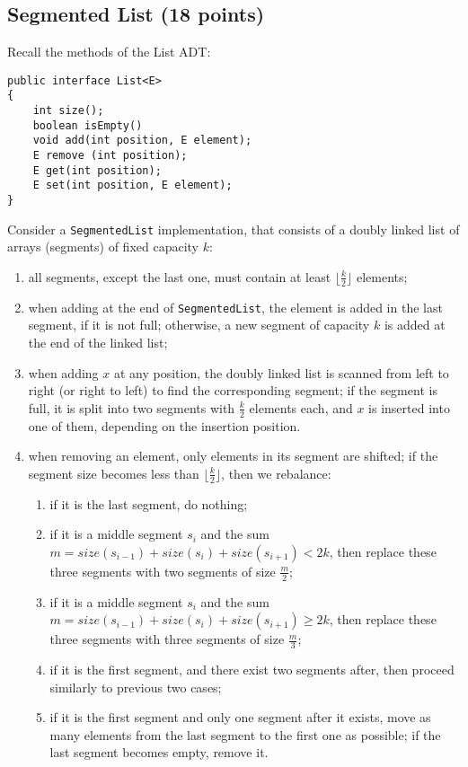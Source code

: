 \documentclass{article}
\begin{document}
\subsection*{Segmented List (18 points)}
Recall the methods of the List ADT:

\begin{verbatim}
public interface List<E>
{
    int size();
    boolean isEmpty()
    void add(int position, E element);
    E remove (int position);
    E get(int position);
    E set(int position, E element);
}    
\end{verbatim}

Consider a \texttt{SegmentedList} implementation, that consists of a doubly linked list of arrays (segments) of fixed capacity $k$:
\begin{enumerate}
    \item all segments, except the last one, must contain at least $\lfloor\frac{k}{2}\rfloor$ elements;
    \item when adding at the end of \texttt{SegmentedList}, the element is added in the last segment, if it is not full; otherwise, a new segment of capacity $k$ is added at the end of the linked list;
    \item when adding $x$ at any position, the doubly linked list is scanned from left to right (or right to left) to find the corresponding segment; if the segment is full, it is split into two segments with $\frac{k}{2}$ elements each, and $x$ is inserted into one of them, depending on the insertion position.
    \item when removing an element, only elements in its segment are shifted; if the segment size becomes less than $\lfloor\frac{k}{2}\rfloor$, then we rebalance:
    \begin{enumerate}
        \item if it is the last segment, do nothing;
        \item if it is a middle segment $s_i$ and the sum $m = size(s_{i-1}) + size(s_i) + size(s_{i+1}) < 2k$, then replace these three segments with two segments of size $\frac{m}{2}$;
        \item if it is a middle segment $s_i$ and the sum $m = size(s_{i-1}) + size(s_i) + size(s_{i+1}) \geq 2k$, then replace these three segments with three segments of size $\frac{m}{3}$;
        \item if it is the first segment, and there exist two segments after, then proceed similarly to previous two cases;
        \item if it is the first segment and only one segment after it exists, move as many elements from the last segment to the first one as possible; if the last segment becomes empty, remove it.
    \end{enumerate}
\end{enumerate}
\end{document}
